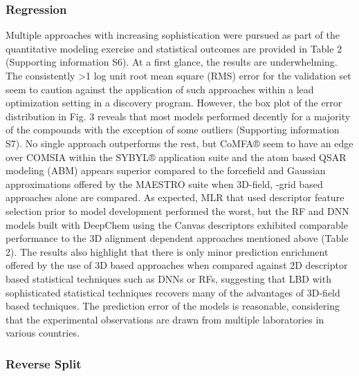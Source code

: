 \subsubsection{Regression}

Multiple approaches with increasing sophistication were pursued as part of the quantitative modeling exercise and statistical outcomes are provided in Table 2 (Supporting information S6).  At a first glance, the results are underwhelming.  The consistently >1 log unit root mean square (RMS) error for the validation set seem to caution against the application of such approaches within a lead optimization setting in a discovery program.  However, the box plot of the error distribution in Fig. 3 reveals that most models performed decently for a majority of the compounds with the exception of some outliers (Supporting information S7).  No single approach outperforms the rest, but CoMFA® seem to have an edge over COMSIA within the SYBYL® application suite and the atom based QSAR modeling (ABM) appears superior compared to the forcefield and Gaussian approximations offered by the MAESTRO suite when 3D-field, -grid based approaches alone are compared.  As expected, MLR that used descriptor feature selection prior to model development performed the worst, but the RF and DNN models built with DeepChem using the Canvas descriptors exhibited comparable performance to the 3D alignment dependent approaches mentioned above (Table 2).  The results also highlight that there is only minor prediction enrichment offered by the use of 3D based approaches when compared against 2D descriptor based statistical techniques such as DNNs or RFs, suggesting that LBD with sophisticated statistical techniques recovers many of the advantages of 3D-field based techniques.  The prediction error of the models is reasonable, considering that the experimental observations are drawn from multiple laboratories in various countries.

\subsubsection{Reverse Split}

